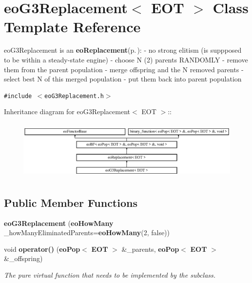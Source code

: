 \section{eo\-G3Replacement$<$ EOT $>$ Class Template Reference}
\label{classeo_g3_replacement}
eo\-G3Replacement is an {\bf eo\-Replacement}{\rm (p.\,\pageref{classeo_replacement})}: - no strong elitism (is suppposed to be within a steady-state engine) - choose N (2) parents RANDOMLY - remove them from the parent population - merge offspring and the N removed parents - select best N of this merged population - put them back into parent population  


{\tt \#include $<$eo\-G3Replacement.h$>$}

Inheritance diagram for eo\-G3Replacement$<$ EOT $>$::\begin{figure}[H]
\begin{center}
\leavevmode
\includegraphics[height=3.01075cm]{classeo_g3_replacement}
\end{center}
\end{figure}
\subsection*{Public Member Functions}
\begin{CompactItemize}
\item 
{\bf eo\-G3Replacement} ({\bf eo\-How\-Many} \_\-how\-Many\-Eliminated\-Parents={\bf eo\-How\-Many}(2, false))\label{classeo_g3_replacement_a0}

\item 
void {\bf operator()} ({\bf eo\-Pop}$<$ {\bf EOT} $>$ \&\_\-parents, {\bf eo\-Pop}$<$ {\bf EOT} $>$ \&\_\-offspring)\label{classeo_g3_replacement_a1}

\begin{CompactList}\small\item\em The pure virtual function that needs to be implemented by the subclass. \item\end{CompactList}\end{CompactItemize}
